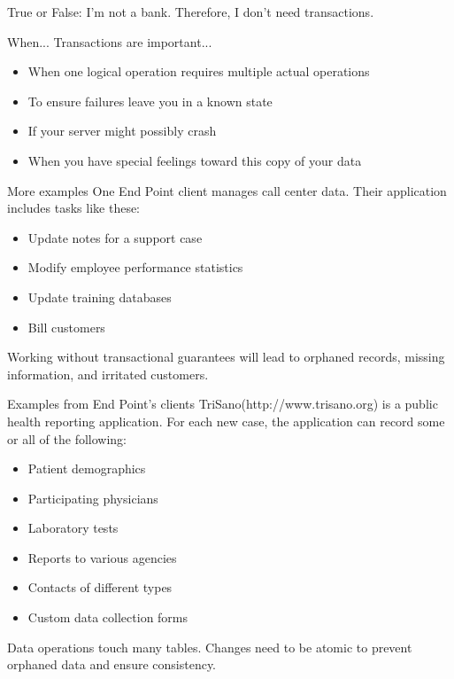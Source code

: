 \documentclass[svgnames]{beamer}
\begin{document}
\begin{frame}
    True or False: I'm not a bank. Therefore, I don't need transactions.
\end{frame}

\begin{frame}{When...}
    Transactions are important...
    \begin{itemize}
        \item When one logical operation requires multiple actual operations
        \item To ensure failures leave you in a known state
        \item If your server might possibly crash
        \item When you have special feelings toward this copy of your data
    \end{itemize}
\end{frame}

\begin{frame}{More examples}
    One End Point client manages call center data. Their application includes
    tasks like these:
    \begin{itemize}
        \item Update notes for a support case
        \item Modify employee performance statistics
        \item Update training databases
        \item Bill customers
    \end{itemize}
    \vspace{10pt}
    Working without transactional guarantees will lead to orphaned records,
    missing information, and irritated customers.
\end{frame}

\begin{frame}{Examples from End Point's clients}
    TriSano\texttrademark  (http://www.trisano.org) is a public health
    reporting application. For each new case, the application can record some
    or all of the following:
    \begin{itemize}
        \item Patient demographics
        \item Participating physicians
        \item Laboratory tests
        \item Reports to various agencies
        \item Contacts of different types
        \item Custom data collection forms
    \end{itemize}
    Data operations touch many tables. Changes need to be atomic to
    prevent orphaned data and ensure consistency.
\end{frame}
\end{document}

